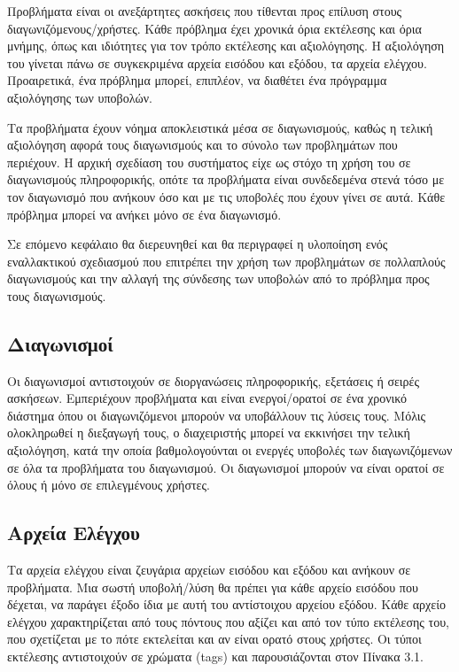 \documentclass[diploma]{softlab-thesis}
\begin{document}
Προβλήματα είναι οι ανεξάρτητες ασκήσεις που τίθενται προς επίλυση στους
διαγωνιζόμενους/χρήστες. Κάθε πρόβλημα έχει χρονικά όρια εκτέλεσης και όρια
μνήμης, όπως και ιδιότητες για τον τρόπο εκτέλεσης και αξιολόγησης. Η
αξιολόγηση του γίνεται πάνω σε συγκεκριμένα αρχεία εισόδου και εξόδου, τα
αρχεία ελέγχου. Προαιρετικά, ένα πρόβλημα μπορεί, επιπλέον, να διαθέτει ένα
πρόγραμμα αξιολόγησης των υποβολών.

\bigskip

Τα προβλήματα έχουν νόημα αποκλειστικά μέσα σε διαγωνισμούς, καθώς η τελική
αξιολόγηση αφορά τους διαγωνισμούς και το σύνολο των προβλημάτων που περιέχουν.
Η αρχική σχεδίαση του συστήματος είχε ως στόχο τη χρήση του σε διαγωνισμούς
πληροφορικής, οπότε τα προβλήματα είναι συνδεδεμένα στενά τόσο με τον
διαγωνισμό που ανήκουν όσο και με τις υποβολές που έχουν γίνει σε αυτά. Κάθε
πρόβλημα μπορεί να ανήκει μόνο σε ένα διαγωνισμό.

\bigskip

Σε επόμενο κεφάλαιο θα διερευνηθεί και θα περιγραφεί η υλοποίηση ενός εναλλακτικού
σχεδιασμού που επιτρέπει την χρήση των προβλημάτων σε πολλαπλούς διαγωνισμούς και
την αλλαγή της σύνδεσης των υποβολών από το πρόβλημα προς τους διαγωνισμούς.

\subsection{Διαγωνισμοί}

Οι διαγωνισμοί αντιστοιχούν σε διοργανώσεις πληροφορικής, εξετάσεις ή σειρές
ασκήσεων. Εμπεριέχουν προβλήματα και είναι ενεργοί/ορατοί σε ένα χρονικό
διάστημα όπου οι διαγωνιζόμενοι μπορούν να υποβάλλουν τις λύσεις τους. Μόλις
ολοκληρωθεί η διεξαγωγή τους, ο διαχειριστής μπορεί να εκκινήσει την τελική
αξιολόγηση, κατά την οποία βαθμολογούνται οι ενεργές υποβολές των
διαγωνιζόμενων σε όλα τα προβλήματα του διαγωνισμού. Οι διαγωνισμοί μπορούν να
είναι ορατοί σε όλους ή μόνο σε επιλεγμένους χρήστες.

\subsection{Αρχεία Ελέγχου}

Τα αρχεία ελέγχου είναι ζευγάρια αρχείων εισόδου και εξόδου και ανήκουν σε
προβλήματα. Μια σωστή υποβολή/λύση θα πρέπει για κάθε αρχείο εισόδου που
δέχεται, να παράγει έξοδο ίδια με αυτή του αντίστοιχου αρχείου εξόδου.  Κάθε
αρχείο ελέγχου χαρακτηρίζεται από τους πόντους που αξίζει και από τον τύπο
εκτέλεσης του, που σχετίζεται με το πότε εκτελείται και αν είναι ορατό στους
χρήστες. Οι τύποι εκτέλεσης αντιστοιχούν σε χρώματα (tags) και παρουσιάζονται
στον Πίνακα 3.1.
\end{document}
